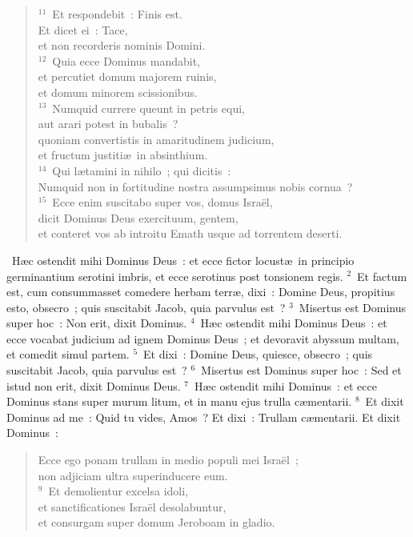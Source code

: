 \begin{flushleft}
\begin{verse}
${}^{11}$~Et respondebit~: Finis est.\\ Et dicet ei~: Tace,\\ et non recorderis nominis Domini.\\
${}^{12}$~Quia ecce Dominus mandabit,\\ et percutiet domum majorem ruinis,\\ et domum minorem scissionibus.\\
${}^{13}$~Numquid currere queunt in petris equi,\\ aut arari potest in bubalis~?\\ quoniam convertistis in amaritudinem judicium,\\ et fructum justiti\ae\ in absinthium.\\
${}^{14}$~Qui l\ae tamini in nihilo~; qui dicitis~:\\ Numquid non in fortitudine nostra assumpsimus nobis cornua~?\\
${}^{15}$~Ecce enim suscitabo super vos, domus Isra\"el,\\ dicit Dominus Deus exercituum, gentem,\\ et conteret vos ab introitu Emath usque ad torrentem deserti.\end{verse}\end{flushleft}


~H\ae c ostendit mihi Dominus Deus~: et ecce fictor locust\ae\ in principio germinantium serotini imbris, et ecce serotinus post tonsionem regis.
${}^{2}$~Et factum est, cum consummasset comedere herbam terr\ae , dixi~: Domine Deus, propitius esto, obsecro~; quis suscitabit Jacob, quia parvulus est~?
${}^{3}$~Misertus est Dominus super hoc~: Non erit, dixit Dominus.
${}^{4}$~H\ae c ostendit mihi Dominus Deus~: et ecce vocabat judicium ad ignem Dominus Deus~; et devoravit abyssum multam, et comedit simul partem.
${}^{5}$~Et dixi~: Domine Deus, quiesce, obsecro~; quis suscitabit Jacob, quia parvulus est~?
${}^{6}$~Misertus est Dominus super hoc~: Sed et istud non erit, dixit Dominus Deus.
${}^{7}$~H\ae c ostendit mihi Dominus~: et ecce Dominus stans super murum litum, et in manu ejus trulla c\ae mentarii.
${}^{8}$~Et dixit Dominus ad me~: Quid tu vides, Amos~? Et dixi~: Trullam c\ae mentarii. Et dixit Dominus~: \begin{flushleft}\begin{verse}Ecce ego ponam trullam in medio populi mei Isra\"el~;\\ non adjiciam ultra superinducere eum.\\
${}^{9}$~Et demolientur excelsa idoli,\\ et sanctificationes Isra\"el desolabuntur,\\ et consurgam super domum Jeroboam in gladio.\end{verse}\end{flushleft}


